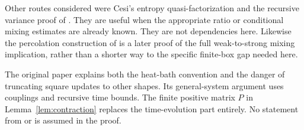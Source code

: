 \documentclass[11pt]{amsart}
\theoremstyle{definition}
\newcommand{\1}{\mathbf 1}
\begin{document}
Other routes considered were Cesi's entropy quasi-factorization
\cite[Section 2, Proposition 2.1, and Section 4, Theorem 4.1]{Cesi} and
the recursive variance proof of
\cite[Section 3.3, Lemma 3.1 and proof of Theorem 2.2]{BCC}. They are useful when the
appropriate ratio or conditional mixing estimates are already known.
They are not dependencies here. Likewise the percolation construction of
\cite[Section 3, Theorem 3.1]{Ott} is a later proof of the full weak-to-strong
mixing implication, rather than a shorter way to the specific finite-box
gap needed here.

The original paper \cite[Section 4, (4.1)--(4.5), Theorem 4.1]{MO}
explains both the heat-bath convention and the danger of truncating square
updates to other shapes. Its general-system argument uses couplings and
recursive time bounds. The finite positive matrix $P$ in
Lemma~\ref{lem:contraction} replaces the time-evolution part entirely.
No statement from \cite{MO} or \cite{MOS} is assumed in the proof.
\end{document}
